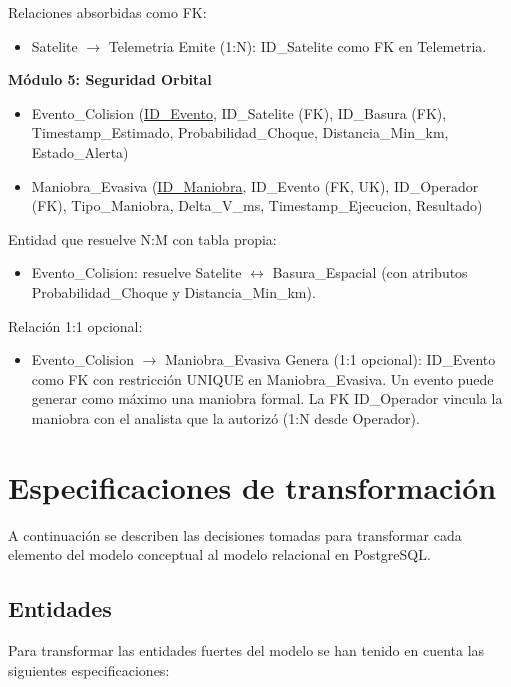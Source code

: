 Relaciones absorbidas como FK:
\begin{itemize}
    \item Satelite $\rightarrow$ Telemetria Emite (1:N): ID\_Satelite como FK en Telemetria.
\end{itemize}

\vspace{0.5cm}
\noindent \textbf{Módulo 5: Seguridad Orbital}

\begin{itemize}
    \item Evento\_Colision (\underline{ID\_Evento}, ID\_Satelite (FK), ID\_Basura (FK), Timestamp\_Estimado, Probabilidad\_Choque, Distancia\_Min\_km, Estado\_Alerta)
    \item Maniobra\_Evasiva (\underline{ID\_Maniobra}, ID\_Evento (FK, UK), ID\_Operador (FK), Tipo\_Maniobra, Delta\_V\_ms, Timestamp\_Ejecucion, Resultado)
\end{itemize}

Entidad que resuelve N:M con tabla propia:
\begin{itemize}
    \item Evento\_Colision: resuelve Satelite $\leftrightarrow$ Basura\_Espacial (con atributos Probabilidad\_Choque y Distancia\_Min\_km).
\end{itemize}

Relación 1:1 opcional:
\begin{itemize}
    \item Evento\_Colision $\rightarrow$ Maniobra\_Evasiva Genera (1:1 opcional): ID\_Evento como FK con restricción UNIQUE en Maniobra\_Evasiva. Un evento puede generar como máximo una maniobra formal. La FK ID\_Operador vincula la maniobra con el analista que la autorizó (1:N desde Operador).
\end{itemize}

\section{Especificaciones de transformación}

A continuación se describen las decisiones tomadas para transformar cada elemento del modelo conceptual al modelo relacional en PostgreSQL.

\subsection{Entidades}

Para transformar las entidades fuertes del modelo se han tenido en cuenta las siguientes especificaciones:

